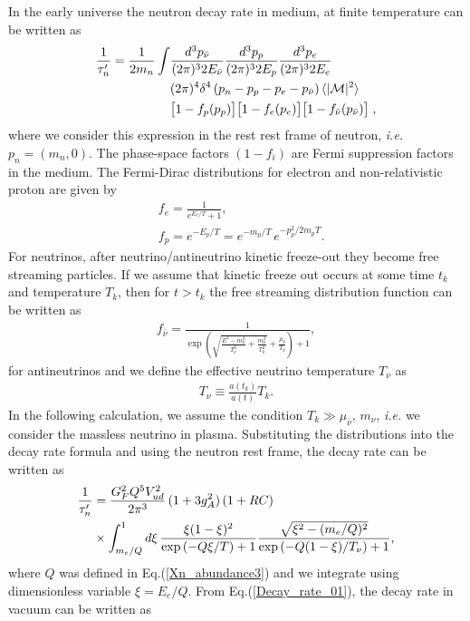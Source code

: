 In the early universe the neutron decay rate in medium, at finite temperature can be written as~\cite{Kuznetsova:2010pi}
\begin{align}
\frac{1}{\tau^\prime_n}=\frac{1}{2m_n}\int&\frac{d^3p_{\bar{\nu}}}{(2\pi)^32E_{\bar{\nu}}}\frac{d^3p_p}{(2\pi)^32E_p}\frac{d^3p_e}{(2\pi)^32E_e}\notag\\
&(2\pi)^4\delta^4\left(p_n-p_p-p_e-p_{\bar{\nu}}\right)\langle|\mathcal{M}|^2\rangle\notag\\
&\big[1-f_p(p_p)\big]\big[1-f_e(p_e)\big]\big[1-f_{\bar{\nu}}(p_{\bar{\nu}})\big]\;,
\end{align}
where we consider this expression in the rest rest frame of neutron, {\it i.e.\/} $p_n=(m_n,0)$. The phase-space factors $(1-f_i)$ are Fermi suppression factors in the medium. The Fermi-Dirac distributions for electron and non-relativistic proton are given by
\begin{align}
&f_e=\frac{1}{e^{E_e/T}+1},\\
&f_p=e^{-E_p/T}=e^{-m_p/T}\,e^{-p_p^2/2m_pT}.
\end{align}
For neutrinos, after neutrino/antineutrino kinetic freeze-out they become free streaming particles. If we assume that kinetic freeze out occurs at some time $t_k$ and temperature $T_k$, then for $t>t_k$ the free streaming distribution function can be written as~\cite{Birrell:2012gg}
\begin{align}
f_{\bar{\nu}}=\frac{1}{\exp{\left(\sqrt{\frac{E^2-m_\nu^2}{T_\nu^2}+\frac{m^2_\nu}{T^2_k}}+\frac{\mu_{\bar{\nu}}}{T_k}\right)+1}},
\end{align}
for antineutrinos and we define the effective neutrino temperature $T_\nu$ as
\begin{align}
T_\nu\equiv\frac{a(t_k)}{a(t)}T_k.
\end{align}
In the following calculation, we assume the condition $T_k\gg\mu_{\bar{\nu}},\,m_\nu$, {\it i.e.\/} we consider the massless neutrino in plasma. Substituting the distributions into the decay rate formula and using the neutron rest frame, the decay rate can be written as 
\begin{align}
\label{Decay_rate_01}
\frac{1}{\tau_n^\prime}&=\frac{G^2_FQ^5V^2_{ud}}{2\pi^3}\,(1+3g^2_A)\,(1+RC)\\
&\times\int^1_{m_e/Q}d\xi\,\frac{\xi(1-\xi)^2}{\exp\left(-Q\xi/{T}\right)+1}\frac{\sqrt{\xi^2-(m_e/Q)^2}}{\exp\left(-Q(1-\xi)/T_\nu\right)+1},\notag
\end{align} 
where $Q$ was defined in Eq.\;(\ref{Xn_abundance3}) and we integrate using dimensionless variable $\xi=E_e/Q$. From Eq.(\ref{Decay_rate_01}), the decay rate in vacuum can be written as
